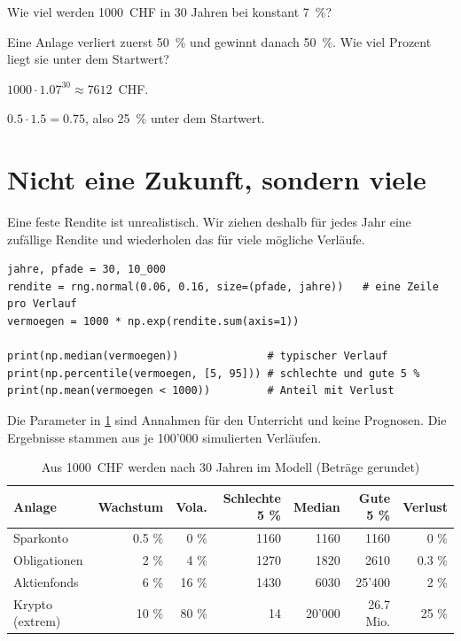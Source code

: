 \begin{myexercise}[Zinseszins]
	\begin{aenum}
		\item Wie viel werden 1000~CHF in 30 Jahren bei konstant 7~\%?
		\item Eine Anlage verliert zuerst 50~\% und gewinnt danach 50~\%. Wie viel Prozent liegt sie unter dem Startwert?
	\end{aenum}
	\begin{myanswer}
		\begin{aenum}
			\item $1000\cdot 1.07^{30} \approx 7612$~CHF.
			\item $0.5 \cdot 1.5 = 0.75$, also 25~\% unter dem Startwert.
		\end{aenum}
	\end{myanswer}
\end{myexercise}

\section{Nicht eine Zukunft, sondern viele}

Eine feste Rendite ist unrealistisch. Wir ziehen deshalb für jedes Jahr eine zufällige Rendite und wiederholen das für viele mögliche Verläufe.

\begin{lstlisting}[style=Python]
jahre, pfade = 30, 10_000
rendite = rng.normal(0.06, 0.16, size=(pfade, jahre))   # eine Zeile pro Verlauf
vermoegen = 1000 * np.exp(rendite.sum(axis=1))

print(np.median(vermoegen))              # typischer Verlauf
print(np.percentile(vermoegen, [5, 95])) # schlechte und gute 5 %
print(np.mean(vermoegen < 1000))         # Anteil mit Verlust
\end{lstlisting}

Die Parameter in \cref{tab:anlagen} sind Annahmen für den Unterricht und keine Prognosen. Die Ergebnisse stammen aus je 100'000 simulierten Verläufen.

\begin{table}[H]
	\centering
	\small
	\caption{Aus 1000~CHF werden nach 30 Jahren im Modell (Beträge gerundet)}
	\label{tab:anlagen}
	\begin{tabular}{@{}lrrrrrr@{}}
		\midrule
		\textbf{Anlage} & \textbf{Wachstum} & \textbf{Vola.} & \textbf{Schlechte 5 \%} & \textbf{Median} & \textbf{Gute 5 \%} & \textbf{Verlust} \\
		\midrule
		Sparkonto & 0.5 \% & 0 \% & 1160 & 1160 & 1160 & 0 \% \\
		Obligationen & 2 \% & 4 \% & 1270 & 1820 & 2610 & 0.3 \% \\
		Aktienfonds & 6 \% & 16 \% & 1430 & 6030 & 25'400 & 2 \% \\
		Krypto (extrem) & 10 \% & 80 \% & 14 & 20'000 & 26.7 Mio. & 25 \% \\
		\midrule
	\end{tabular}
\end{table}


